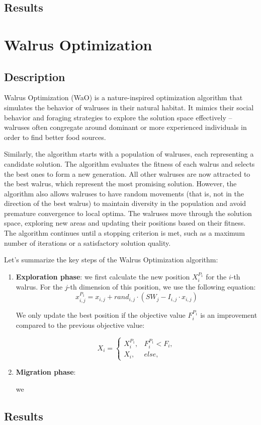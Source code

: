 \documentclass{article}
\begin{document}
\subsection{Results}

\section{Walrus Optimization}

\subsection{Description}

Walrus Optimization (WaO) is a nature-inspired optimization algorithm
that simulates the behavior of walruses in their natural habitat.
It mimics their social behavior and foraging strategies to explore the
solution space effectively -- walruses often congregate around dominant
or more experienced individuals in order to find better food sources.

Similarly, the algorithm starts with a population of walruses, each
representing a candidate solution. The algorithm evaluates the
fitness of each walrus and selects the best ones to form a new
generation. All other walruses are now attracted to the best walrus,
which represent the most promising solution. However, the algorithm
also allows walruses to have random movements (that is, not in the
direction of the best walrus) to maintain diversity in the population
and avoid premature convergence to local optima. The walruses move
through the solution space, exploring new areas and updating their
positions based on their fitness. The algorithm continues until a
stopping criterion is met, such as a maximum number of iterations or
a satisfactory solution quality.

Let's summarize the key steps of the Walrus Optimization algorithm:

\begin{enumerate}
  \item \textbf{Exploration phase}: we first calculate the new
    position ${X}_{i}^{{P}_{1}}$ for the $i$-th walrus. For the $j$-th dimension
    of this position, we use the following equation:
    $$
    {x}_{i,j}^{{P}_{1 }} = {x}_{i,j}+{rand}_{i,j} \cdot \left( SW_j -
    I_{i,j} \cdot x_{i,j} \right)
    $$

    We only update the best position if the objective value
    $F_i^{P_1}$ is an improvement
    compared to the previous objective value:

    $$
    {X}_{i}=\left\{
      \begin{array}{ll}{X}_{i}^{{P}_{1}}, &
        {F}_{i}^{{P}_{1}}<{F}_{i},\\ {X}_{i}, & else,
      \end{array}
      \right.
      $$

    \item \textbf{Migration phase}:

      we
  \end{enumerate}

  \subsection{Results}

  \printbibliography[title={References}]

  
\end{document}

